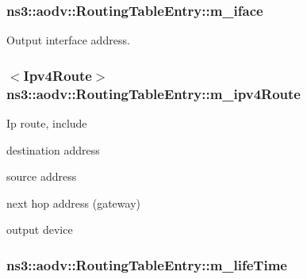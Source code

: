 \subsubsection[{\texorpdfstring{m\+\_\+iface}{m_iface}}]{ ns3\+::aodv\+::\+Routing\+Table\+Entry\+::m\+\_\+iface\hspace{0.3cm}{\ttfamily [private]}}\hypertarget{classns3_1_1aodv_1_1RoutingTableEntry_a150a354a9c36dbdc1e65f8b0f3b1fd05}{}\label{classns3_1_1aodv_1_1RoutingTableEntry_a150a354a9c36dbdc1e65f8b0f3b1fd05}


Output interface address. 

\subsubsection[{\texorpdfstring{m\+\_\+ipv4\+Route}{m_ipv4Route}}]{$<${\bf Ipv4\+Route}$>$ ns3\+::aodv\+::\+Routing\+Table\+Entry\+::m\+\_\+ipv4\+Route\hspace{0.3cm}{\ttfamily [private]}}\hypertarget{classns3_1_1aodv_1_1RoutingTableEntry_a7027a4ad689f53a7c88edfc39edb68cb}{}\label{classns3_1_1aodv_1_1RoutingTableEntry_a7027a4ad689f53a7c88edfc39edb68cb}
Ip route, include
\begin{DoxyItemize}
\item destination address
\item source address
\item next hop address (gateway)
\item output device 
\end{DoxyItemize}
\subsubsection[{\texorpdfstring{m\+\_\+life\+Time}{m_lifeTime}}]{ ns3\+::aodv\+::\+Routing\+Table\+Entry\+::m\+\_\+life\+Time\hspace{0.3cm}{\ttfamily [private]}}\hypertarget{classns3_1_1aodv_1_1RoutingTableEntry_add4e939cc8f711981b981007273139d5}{}\label{classns3_1_1aodv_1_1RoutingTableEntry_add4e939cc8f711981b981007273139d5}



